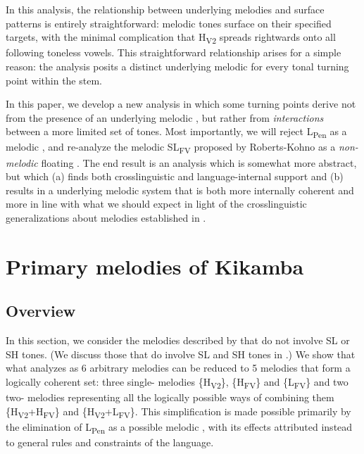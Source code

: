 \documentclass[output=paper,newtxmath,modfonts,nonflat,draft]{langsci/langscibook}
\begin{document}
\newpage 
In this analysis, the relationship between underlying  melodies and surface  patterns is entirely straightforward: melodic tones surface on their specified targets, with the minimal complication that H\textsubscript{V2} spreads rightwards onto all following toneless vowels. This straightforward relationship arises for a simple reason: the analysis posits a distinct underlying melodic  for every tonal turning point within the stem.

In this paper, we develop a new analysis in which some turning points derive not from the presence of an underlying melodic , but rather from \textit{interactions} between a more limited set of tones. Most importantly, we will reject L\textsubscript{Pen} as a melodic , and re-analyze the melodic SL\textsubscript{FV}  proposed by Roberts-Kohno as a \textit{non-melodic} floating . The end result is an analysis which is somewhat more abstract, but which (a) finds both crosslinguistic and language-internal support and (b) results in a underlying melodic system that is both more internally coherent and more in line with what we should expect in light of the crosslinguistic generalizations about  melodies established in .

\section{Primary melodies of Kikamba}\label{sec:jones:3}
\subsection{Overview}\label{sec:jones:3.1}

In this section, we consider the melodies described by \citet{Roberts-Kohno2014} that do not involve SL or SH tones. (We discuss those that do involve SL and SH tones in .) We show that what \citet{Roberts-Kohno2014} analyzes as 6 arbitrary melodies can be reduced to 5 melodies that form a logically coherent set: three single- melodies \{H\textsubscript{V2}\}, \{H\textsubscript{FV}\} and \{L\textsubscript{FV}\} and two two- melodies representing all the logically possible ways of combining them \{H\textsubscript{V2}+H\textsubscript{FV}\} and \{H\textsubscript{V2}+L\textsubscript{FV}\}. This simplification is made possible primarily by the elimination of L\textsubscript{Pen} as a possible melodic , with its effects attributed instead to general rules and constraints of the language.
\end{document}
